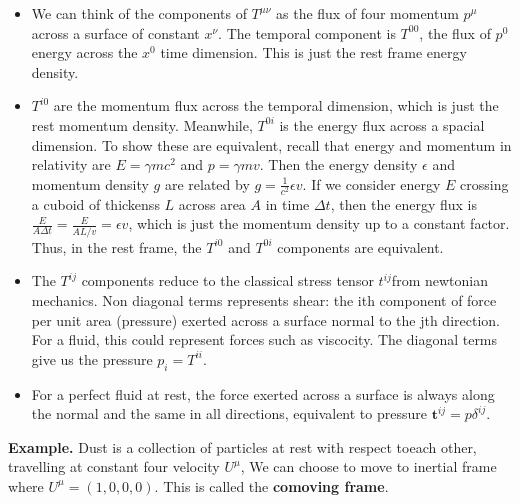 \documentclass[11pt]{article}
\begin{document}
\begin{itemize}


    \item We can think of the components of \(T^{\mu\nu}\) as the flux of four momentum \(p^\mu\) across a surface of constant \(x^\nu\). The
    temporal component is \(T^{0 0}\), the flux of \(p^0\) energy across the \(x^0\) time dimension. This is just the rest frame energy density.

    \item \(T^{i 0}\) are the momentum flux across the temporal dimension, which is just the rest momentum density. Meanwhile, \(T^{0 i}\) is the 
    energy flux across a spacial dimension. To show these are equivalent, recall that energy and momentum in relativity are \(E = \gamma m c^2\) and
    \(p = \gamma mv\). Then the energy density \(\epsilon\) and momentum density \(g\) are related by \(g = \frac{1}{c^2}\epsilon v\). If we consider energy
    \(E\) crossing a cuboid of thickenss \(L\) across area \(A\) in time \(\Delta t\), then the energy flux is \(\frac{E}{A\Delta t} = \frac{E}{AL/v} = \epsilon v\),
    which is just the momentum density up to a constant factor. Thus, in the rest frame, the \(T^{i 0}\) and \(T^{0 i}\) components are equivalent.

    \item The \(T^{i j}\) components reduce to the classical stress tensor \(t^{i j}\)from newtonian mechanics. Non diagonal terms represents shear: the ith component of force
    per unit area (pressure) exerted across a surface normal to the jth direction. For a fluid, this could represent forces such as viscocity. The diagonal terms
    give us the pressure \(p_i = T^{i i}\).

    \item For a perfect fluid at rest, the force exerted across a surface is always along the normal and the same in all directions, equivalent
    to pressure $\mathbf{t}^{ij} = p\delta^{ij}$.

\end{itemize}
\noindent \textbf{Example.} Dust is a collection of particles at rest with respect toeach other, travelling at constant four velocity \( U^{{\mu}} \),
We can choose  to move to inertial frame where $U^{\mu} = (1,0,0,0)$. This is called the \textbf{comoving frame}.
\end{document}
